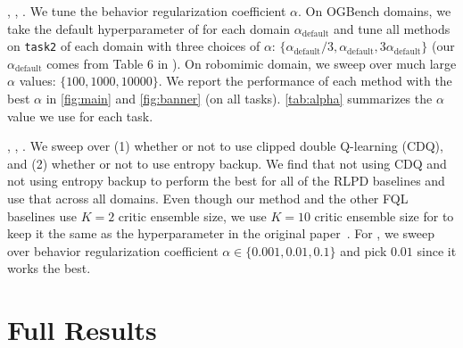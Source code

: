 , , . We tune the behavior regularization coefficient $\alpha$. On OGBench domains, we take the default hyperparameter of  for each domain $\alpha_{\mathrm{default}}$ and tune all methods on \texttt{task2} of each domain with three choices of $\alpha$: $\{\alpha_{\mathrm{default}} / 3, \alpha_{\mathrm{default}}, 3\alpha_{\mathrm{default}} \}$ (our $\alpha_{\mathrm{default}}$ comes from Table 6 in \citet{park2025flow}). On robomimic domain, we sweep over much large $\alpha$ values: $\{100, 1000, 10000\}$. We report the performance of each method with the best $\alpha$ in \cref{fig:main} and \cref{fig:banner} (on all tasks). \cref{tab:alpha} summarizes the $\alpha$ value we use for each task. 

, , . We sweep over (1) whether or not to use clipped double Q-learning (CDQ), and (2) whether or not to use entropy backup. We find that not using CDQ and not using entropy backup to perform the best for all of the RLPD baselines and use that across all domains. Even though our method and the other FQL baselines use $K=2$ critic ensemble size, we use $K=10$ critic ensemble size for  to keep it the same as the hyperparameter in the original paper~\citep{ball2023efficient}. 
For , we sweep over behavior regularization coefficient $\alpha \in \{0.001, 0.01, 0.1\}$ and pick $0.01$ since it works the best.




\section{Full Results}
\label{appendix:results}


